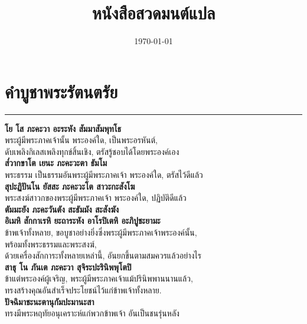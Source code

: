 \documentclass[12pt]{article}
\title{หนังสือสวดมนต์แปล}
\date{\today}
\begin{document}
\pagecolor{lightyellow}
\maketitle
\newpage
\tableofcontents

\pagebreak

\begin{titlepage}

\vspace*{\fill}
\begin{center}
\end{center}
\vspace{\fill}

\end{titlepage}
\pagebreak


\section{คำบูชาพระรัตนตรัย}
\hrule
\textbf{โย โส ภะคะวา อะระหัง สัมมาสัมพุทโธ}\\
\indent พระผู้มีพระภาคเจ้านั้น พระองค์ใด, เป็นพระอรหันต์, \\
\indent ดับเพลิงกิเลสเพลิงทุกข์สิ้นเชิง, ตรัสรู้ชอบได้โดยพระองค์เอง\\
\textbf{ส๎วากขาโต เยนะ ภะคะวะตา ธัมโม}\\
\indent พระธรรม เป็นธรรมอันพระผู้มีพระภาคเจ้า พระองค์ใด, ตรัสไว้ดีแล้ว\\
\textbf{สุปะฏิปันโน ยัสสะ ภะคะวะโต สาวะกะสังโฆ}\\
\indent พระสงฆ์สาวกของพระผู้มีพระภาคเจ้า พระองค์ใด, ปฏิบัติดีแล้ว\\
\textbf{ตัมมะยัง ภะคะวันตัง สะธัมมัง สะสังฆัง\\
อิเมหิ สักกาเรหิ ยะถาระหัง อาโรปิเตหิ อะภิปูชะยามะ}\\
\indent ข้าพเจ้าทั้งหลาย, ขอบูชาอย่างยิ่งซึ่งพระผู้มีพระภาคเจ้าพระองค์นั้น,\\
\indent พร้อมทั้งพระธรรมและพระสงฆ์,\\
\indent ด้วยเครื่องสักการะทั้งหลายเหล่านี้, อันยกขึ้นตามสมควรแล้วอย่างไร\\
\textbf{สาธุ โน ภันเต ภะคะวา สุจิระปะรินิพพุโตปิ}\\
\indent ข้าแต่พระองค์ผู้เจริญ, พระผู้มีพระภาคเจ้าแม้ปรินิพพานนานแล้ว,\\
\indent ทรงสร้างคุณอันสำเร็จประโยชน์ไว้แก่ข้าพเจ้าทั้งหลาย.\\
\textbf{ปัจฉิมาชะนะตานุกัมปะมานะสา}\\
\indent ทรงมีพระหฤทัยอนุเคราะห์แก่พวกข้าพเจ้า อันเป็นชนรุ่นหลัง\\
\end{document}
